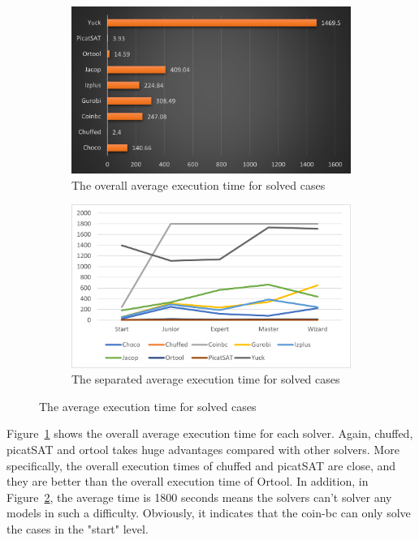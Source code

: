 \begin{figure}[htbp]
\centering
\begin{subfigure}{0.48\textwidth}
\includegraphics[width=\textwidth]{figs/averagetime.png}
\caption{The overall average execution time for solved cases}
\label{fig:averagetime1}
\end{subfigure}
\begin{subfigure}{0.48\textwidth}
\includegraphics[width=\textwidth]{figs/separated time.png}
\caption{The separated average execution time for solved cases}
\label{fig:averagetime2}
\end{subfigure}
\caption{The average execution time for solved cases}
\label{fig:averagetime}
\end{figure}
Figure~\ref{fig:averagetime1} shows the overall average execution time for each solver. Again, chuffed, picatSAT and ortool takes huge advantages compared with other solvers. More specifically, the overall execution times of chuffed and picatSAT are close, and they are better than the overall execution time of Ortool. In addition, in Figure~\ref{fig:averagetime2}, the average time is 1800 seconds means the solvers can't solver any models in such a difficulty. Obviously, it indicates that the coin-bc can only solve the cases in the "start" level.
